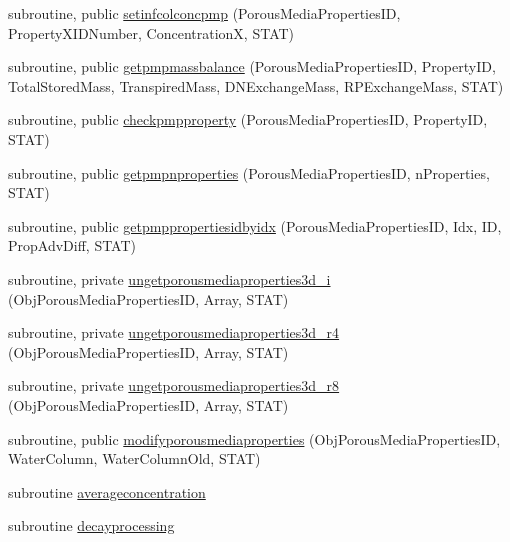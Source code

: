 \begin{DoxyCompactItemize}
\item 
subroutine, public \mbox{\hyperlink{namespacemoduleporousmediaproperties_ad6dda3a878f9da43d0b12164c09edd9d}{setinfcolconcpmp}} (Porous\+Media\+Properties\+ID, Property\+X\+I\+D\+Number, ConcentrationX, S\+T\+AT)
\item 
subroutine, public \mbox{\hyperlink{namespacemoduleporousmediaproperties_aa5824bb6f506f737243ff62a77a6d38c}{getpmpmassbalance}} (Porous\+Media\+Properties\+ID, Property\+ID, Total\+Stored\+Mass, Transpired\+Mass, D\+N\+Exchange\+Mass, R\+P\+Exchange\+Mass, S\+T\+AT)
\item 
subroutine, public \mbox{\hyperlink{namespacemoduleporousmediaproperties_aff227e766a06094629675d29f5f9e972}{checkpmpproperty}} (Porous\+Media\+Properties\+ID, Property\+ID, S\+T\+AT)
\item 
subroutine, public \mbox{\hyperlink{namespacemoduleporousmediaproperties_a91af77c6bf746b618fd509c6ceb5b42d}{getpmpnproperties}} (Porous\+Media\+Properties\+ID, n\+Properties, S\+T\+AT)
\item 
subroutine, public \mbox{\hyperlink{namespacemoduleporousmediaproperties_af2bce43f88ee94ebe28c4b5f01c9f098}{getpmppropertiesidbyidx}} (Porous\+Media\+Properties\+ID, Idx, ID, Prop\+Adv\+Diff, S\+T\+AT)
\item 
subroutine, private \mbox{\hyperlink{namespacemoduleporousmediaproperties_a08471307dc61da0cc694bc4e7b47b840}{ungetporousmediaproperties3d\+\_\+i}} (Obj\+Porous\+Media\+Properties\+ID, Array, S\+T\+AT)
\item 
subroutine, private \mbox{\hyperlink{namespacemoduleporousmediaproperties_ae5667c60b268b4c99e403dc08b831ee5}{ungetporousmediaproperties3d\+\_\+r4}} (Obj\+Porous\+Media\+Properties\+ID, Array, S\+T\+AT)
\item 
subroutine, private \mbox{\hyperlink{namespacemoduleporousmediaproperties_adae76989107c8fbe8fc908a111ea82ad}{ungetporousmediaproperties3d\+\_\+r8}} (Obj\+Porous\+Media\+Properties\+ID, Array, S\+T\+AT)
\item 
subroutine, public \mbox{\hyperlink{namespacemoduleporousmediaproperties_af5a9da28db32e6f4ed9c06f73a7dc775}{modifyporousmediaproperties}} (Obj\+Porous\+Media\+Properties\+ID, Water\+Column, Water\+Column\+Old, S\+T\+AT)
\item 
subroutine \mbox{\hyperlink{namespacemoduleporousmediaproperties_aa717037551efabb3abaec9e2f610d0f3}{averageconcentration}}
\item 
subroutine \mbox{\hyperlink{namespacemoduleporousmediaproperties_a9e33074d02a745b0e8cd90eccef5b5ed}{decayprocessing}}

\end{DoxyCompactItemize}
